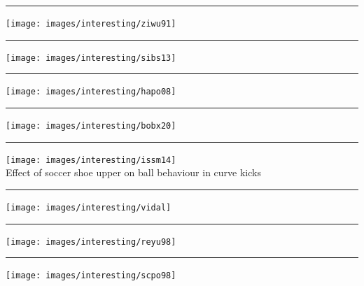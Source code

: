 \par\noindent\rule{\textwidth}{0.4pt}
\begin{center}
\texttt{[image: images/interesting/ziwu91]} {\tiny \cite{ziwu91}}
\end{center}

\par\noindent\rule{\textwidth}{0.4pt}
\begin{center}
\texttt{[image: images/interesting/sibs13]} {\tiny \cite{sibs13}}
\end{center}

\par\noindent\rule{\textwidth}{0.4pt}
\begin{center}
\texttt{[image: images/interesting/hapo08]} {\tiny \cite{hapo08}}
\end{center}

\par\noindent\rule{\textwidth}{0.4pt}
\begin{center}
\texttt{[image: images/interesting/bobx20]} {\tiny \cite{bobx20}}
\end{center}

\par\noindent\rule{\textwidth}{0.4pt}
\begin{center}
\texttt{[image: images/interesting/issm14]}\\ {\captionfont
Effect of soccer shoe upper on ball behaviour in curve kicks \cite{issm14}}
\end{center}

\par\noindent\rule{\textwidth}{0.4pt}
\begin{center}
\texttt{[image: images/interesting/vidal]} {\captionfont \cite{vidal}}
\end{center}


\par\noindent\rule{\textwidth}{0.4pt}
\begin{center}
\texttt{[image: images/interesting/reyu98]} {\captionfont \cite{reyu98}}
\end{center}

\par\noindent\rule{\textwidth}{0.4pt}
\begin{center}
\texttt{[image: images/interesting/scpo98]} {\captionfont \cite{scpo98}}
\end{center}

